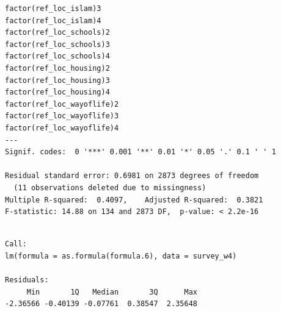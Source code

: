 \documentclass[
]{article}
\begin{document}
\begin{table}
\begin{minipage}[t]{\linewidth}
{\begin{verbatim}
factor(ref_loc_islam)3                                                               
factor(ref_loc_islam)4                                                               
factor(ref_loc_schools)2                                                             
factor(ref_loc_schools)3                                                             
factor(ref_loc_schools)4                                                             
factor(ref_loc_housing)2                                                             
factor(ref_loc_housing)3                                                             
factor(ref_loc_housing)4                                                             
factor(ref_loc_wayoflife)2                                                           
factor(ref_loc_wayoflife)3                                                           
factor(ref_loc_wayoflife)4                                                           
---
Signif. codes:  0 '***' 0.001 '**' 0.01 '*' 0.05 '.' 0.1 ' ' 1

Residual standard error: 0.6981 on 2873 degrees of freedom
  (11 observations deleted due to missingness)
Multiple R-squared:  0.4097,    Adjusted R-squared:  0.3821 
F-statistic: 14.88 on 134 and 2873 DF,  p-value: < 2.2e-16
\end{verbatim}

}

\end{minipage}%
\newline
\begin{minipage}[t]{\linewidth}

{\centering 

\begin{verbatim}

Call:
lm(formula = as.formula(formula.6), data = survey_w4)

Residuals:
     Min       1Q   Median       3Q      Max 
-2.36566 -0.40139 -0.07761  0.38547  2.35648 


\end{verbatim}}
\end{minipage}
\end{table}
\end{document}
